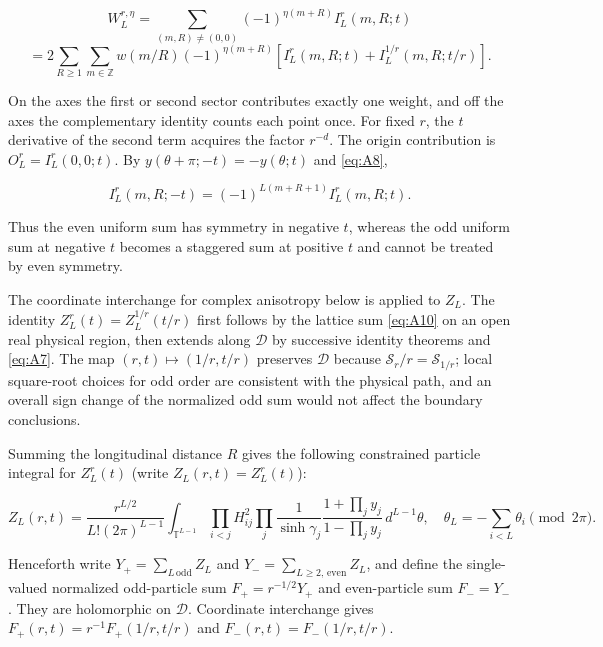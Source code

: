 \documentclass[11pt,a4paper]{article}
\numberwithin{equation}{section}
\theoremstyle{plain}
\theoremstyle{definition}
\begin{document}
\[W_L^{r,\eta}=\sum_{(m,R)\ne(0,0)}(-1)^{\eta(m+R)}I_L^r(m,R;t)\]
\begin{equation}
=2\sum_{R\ge1}\sum_{m\in\mathbb Z}w(m/R)(-1)^{\eta(m+R)}\left[I_L^r(m,R;t)+I_L^{1/r}(m,R;t/r)\right].
\label{eq:A11}
\end{equation}

On the axes the first or second sector contributes exactly one weight, and off the axes the complementary identity counts each point once. For fixed \(r\), the \(t\) derivative of the second term acquires the factor \(r^{-d}\). The origin contribution is \(O_L^r=I_L^r(0,0;t)\). By \(y(\theta+\pi;-t)=-y(\theta;t)\) and \eqref{eq:A8},

\begin{equation}
I_L^r(m,R;-t)=(-1)^{L(m+R+1)}I_L^r(m,R;t).
\label{eq:A12}
\end{equation}

Thus the even uniform sum has symmetry in negative \(t\), whereas the odd uniform sum at negative \(t\) becomes a staggered sum at positive \(t\) and cannot be treated by even symmetry.

The coordinate interchange for complex anisotropy below is applied to \(Z_L\). The identity \(Z_L^r(t)=Z_L^{1/r}(t/r)\) first follows by the lattice sum \eqref{eq:A10} on an open real physical region, then extends along \(\mathcal D\) by successive identity theorems and \eqref{eq:A7}. The map \((r,t)\mapsto(1/r,t/r)\) preserves \(\mathcal D\) because \(\mathcal S_r/r=\mathcal S_{1/r}\); local square-root choices for odd order are consistent with the physical path, and an overall sign change of the normalized odd sum would not affect the boundary conclusions.

Summing the longitudinal distance \(R\) gives the following constrained particle integral for \(Z_L^r(t)\) (write \(Z_L(r,t)=Z_L^r(t)\)):

\begin{equation}
Z_L(r,t)=\frac{r^{L/2}}{L!(2\pi)^{L-1}}\int_{\mathbb T^{L-1}}\prod_{i<j}H_{ij}^2\prod_j\frac1{\sinh\gamma_j}\frac{1+\prod_j y_j}{1-\prod_j y_j}\,d^{L-1}\theta,\quad\theta_L=-\sum_{i<L}\theta_i\pmod{2\pi}.
\label{eq:B1}
\end{equation}

Henceforth write \(Y_+=\sum_{L\,\mathrm{odd}}Z_L\) and \(Y_-=\sum_{L\ge2,\,\mathrm{even}}Z_L\), and define the single-valued normalized odd-particle sum \(F_+=r^{-1/2}Y_+\) and even-particle sum \(F_-=Y_-\). They are holomorphic on \(\mathcal D\). Coordinate interchange gives \(F_+(r,t)=r^{-1}F_+(1/r,t/r)\) and \(F_-(r,t)=F_-(1/r,t/r)\).
\end{document}
